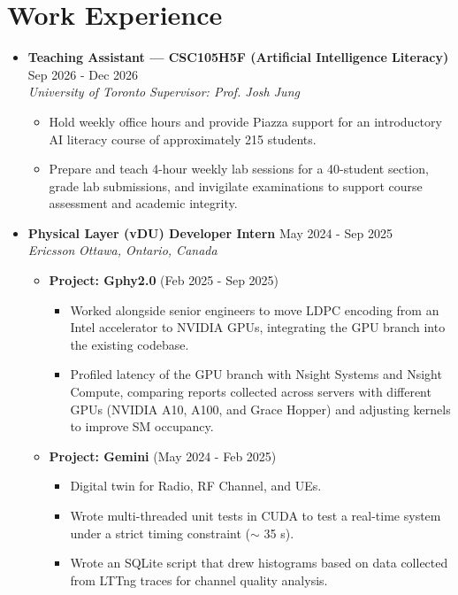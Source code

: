 \documentclass{article}
\begin{document}
\section*{Work Experience}
\begin{itemize}
  \item[] \textbf{Teaching Assistant --- CSC105H5F (Artificial Intelligence Literacy)} \hfill Sep 2026 - Dec 2026 \\
  \textit{University of Toronto} \hfill \textit{Supervisor: Prof. Josh Jung}
  \vspace{-5px}
  \begin{itemize}
    \item Hold weekly office hours and provide Piazza support for an introductory AI literacy course of approximately 215 students.
    \item Prepare and teach 4-hour weekly lab sessions for a 40-student section, grade lab submissions, and invigilate examinations to support course assessment and academic integrity.
  \end{itemize}
  \vspace{3px}

  \item[] \textbf{Physical Layer (vDU) Developer Intern} \hfill May 2024 - Sep 2025 \\
  \textit{Ericsson} \hfill \textit{Ottawa, Ontario, Canada}
  \vspace{-5px}
  \begin{itemize}
    \item[] \textbf{Project: Gphy2.0} (Feb 2025 - Sep 2025)
    \begin{itemize}
      \item Worked alongside senior engineers to move LDPC encoding from an Intel accelerator to NVIDIA GPUs, integrating the GPU branch into the existing codebase.
      \item Profiled latency of the GPU branch with Nsight Systems and Nsight Compute, comparing reports collected across servers with different GPUs (NVIDIA A10, A100, and Grace Hopper) and adjusting kernels to improve SM occupancy.
    \end{itemize}
    \vspace{3px}
    \item[] \textbf{Project: Gemini} (May 2024 - Feb 2025)
    \begin{itemize}
      \item Digital twin for Radio, RF Channel, and UEs.
      \item Wrote multi-threaded unit tests in CUDA to test a real-time system under a strict timing constraint ($\sim$ 35 \textmu s).
      \item Wrote an SQLite script that drew histograms based on data collected from LTTng traces for channel quality analysis.
    \end{itemize}
  \end{itemize}
\end{itemize}
\end{document}
